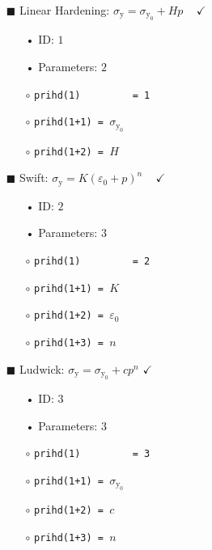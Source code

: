 \documentclass[11pt,a4paper,twoside,final,onecolumn,titlepage]{article}
\newcommand{\verified}{\hspace{0.5pt} {\LARGE $\checkmark$}}
\begin{document}
\begin{itemize}
	\item[\tiny$\blacksquare$] Linear Hardening: $\displaystyle \sigma_{\textrm{y}} = \sigma_{\textrm{y}_0} + Hp$\,\,\,\,\,\verified{}
	\begin{itemize}
		\item[•] ID: $1$
		\item[•] Parameters: $2$\\
		\item[$\circ$] \texttt{prihd(1)\,\,\,\,\,\,\,\,\,= 1}
		\item[$\circ$] \texttt{prihd(1+1) = $\sigma_{\textrm{y}_0} $}
		\item[$\circ$] \texttt{prihd(1+2) = $H$}\\
	\end{itemize}
\end{itemize}

\newpage
\begin{itemize}
	\item[\tiny$\blacksquare$] Swift: $\displaystyle \sigma_{\textrm{y}} = K\left(\varepsilon_{0}+p\right)^n$\,\,\,\,\,\verified{}
	\begin{itemize}
		\item[•] ID: $2$
		\item[•] Parameters: $3$\\
		\item[$\circ$] \texttt{prihd(1)\,\,\,\,\,\,\,\,\,= 2}
		\item[$\circ$] \texttt{prihd(1+1) = $K$}
		\item[$\circ$] \texttt{prihd(1+2) = $\varepsilon_0$}
		\item[$\circ$] \texttt{prihd(1+3) = $n$}\\
	\end{itemize}
\end{itemize}

\begin{itemize}
	\item[\tiny$\blacksquare$] Ludwick: $\displaystyle \sigma_{\textrm{y}} = \sigma_{\textrm{y}_0} +cp^n$ \verified{}
	\begin{itemize}
		\item[•] ID: $3$
		\item[•] Parameters: $3$\\
		\item[$\circ$] \texttt{prihd(1)\,\,\,\,\,\,\,\,\,= 3}
		\item[$\circ$] \texttt{prihd(1+1) = $\sigma_{\textrm{y}_0} $}
		\item[$\circ$] \texttt{prihd(1+2) = $c$}
		\item[$\circ$] \texttt{prihd(1+3) = $n$}\\
	\end{itemize}
\end{itemize}
\end{document}
